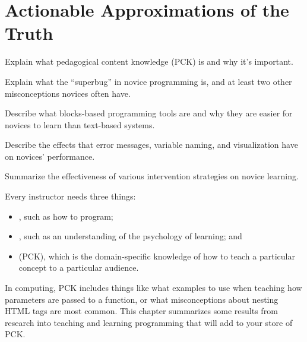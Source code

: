 \chapter{Actionable Approximations of the Truth}\label{s:pck}

\begin{objectives}

\item Explain what pedagogical content knowledge (PCK) is and why it's
  important.

\item Explain what the ``superbug'' in novice programming is, and at
  least two other misconceptions novices often have.

\item Describe what blocks-based programming tools are and why they
  are easier for novices to learn than text-based systems.

\item Describe the effects that error messages, variable naming, and
  visualization have on novices' performance.

\item Summarize the effectiveness of various intervention strategies
  on novice learning.

\end{objectives}

Every instructor needs three things:

\begin{itemize}

\item {}, such as how
  to program;

\item {}, such as an understanding of the psychology of learning;
  and

\item {} (PCK), which is the domain-specific knowledge of
  how to teach a particular concept to a particular audience.

\end{itemize}

In computing, PCK includes things like what examples to use when
teaching how parameters are passed to a function, or what
misconceptions about nesting HTML tags are most common.  This chapter
summarizes some results from research into teaching and learning
programming that will add to your store of PCK.

